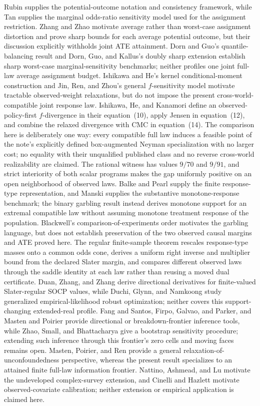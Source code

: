\documentclass{article}
\begin{document}
Rubin supplies the potential-outcome notation and consistency framework, while Tan supplies the marginal odds-ratio sensitivity model used for the assignment restriction. Zhang and Zhao motivate average rather than worst-case assignment distortion and prove sharp bounds for each average potential outcome, but their discussion explicitly withholds joint ATE attainment. Dorn and Guo's quantile-balancing result and Dorn, Guo, and Kallus's doubly sharp extension establish sharp worst-case marginal-sensitivity benchmarks; neither profiles one joint full-law average assignment budget. Ishikawa and He's kernel conditional-moment construction and Jin, Ren, and Zhou's general \(f\)-sensitivity model motivate tractable observed-weight relaxations, but do not impose the present cross-world-compatible joint response law. Ishikawa, He, and Kanamori define an observed-policy-first \(f\)-divergence in their equation~(10), apply Jensen in equation~(12), and combine the relaxed divergence with CMC in equation~(14). The comparison here is deliberately one way: every compatible full law induces a feasible point of the note's explicitly defined box-augmented Neyman specialization with no larger cost; no equality with their unqualified published class and no reverse cross-world realizability are claimed. The rational witness has values \(9/70\) and \(9/91\), and strict interiority of both scalar programs makes the gap uniformly positive on an open neighborhood of observed laws. Balke and Pearl supply the finite response-type representation, and Manski supplies the substantive monotone-response benchmark; the binary garbling result instead derives monotone support for an extremal compatible law without assuming monotone treatment response of the population. Blackwell's comparison-of-experiments order motivates the garbling language, but does not establish preservation of the two observed causal margins and ATE proved here. The regular finite-sample theorem rescales response-type masses onto a common odds cone, derives a uniform right inverse and multiplier bound from the declared Slater margin, and compares different observed laws through the saddle identity at each law rather than reusing a moved dual certificate. Duan, Zhang, and Zhang derive directional derivatives for finite-valued Slater-regular SOCP values, while Duchi, Glynn, and Namkoong study generalized empirical-likelihood robust optimization; neither covers this support-changing extended-real profile. Fang and Santos, Firpo, Galvao, and Parker, and Masten and Poirier provide directional or breakdown-frontier inference tools, while Zhao, Small, and Bhattacharya give a bootstrap sensitivity procedure; extending such inference through this frontier's zero cells and moving faces remains open. Masten, Poirier, and Ren provide a general relaxation-of-unconfoundedness perspective, whereas the present result specializes to an attained finite full-law information frontier. Nattino, Ashmead, and Lu motivate the undeveloped complex-survey extension, and Cinelli and Hazlett motivate observed-covariate calibration; neither extension or empirical application is claimed here.
\end{document}
